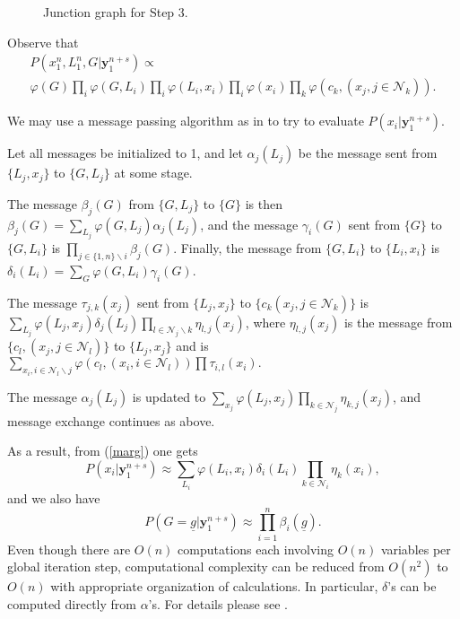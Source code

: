 \begin{figure}
\caption{Junction graph for Step 3.}
\end{figure}

Observe that
\begin{equation}\begin{array}{lll}
P(x_1^n,L_1^n,G|\mathbf{y}_1^{n+s}) \propto \\\varphi(G) \prod_{i}
\varphi(G,L_i) \prod_{i} \varphi(L_i,x_i) \prod_i\varphi(x_i)
\prod_k \varphi(c_k,(x_j, j \in \mathcal{N}_k)).\end{array}
\end{equation}

We may use a message passing algorithm as in \cite{aji} to try to
evaluate  $P(x_i|\mathbf{y}_1^{n+s})$.

Let all messages be initialized to 1, and let $\alpha_j(L_j)$ be
the message sent from $\{L_j,x_j\}$ to $\{G,L_j\}$ at some stage.

The message $\beta_j(G)$ from $\{G,L_j\}$ to $\{G\}$ is then
$\beta_j(G)=\sum_{L_j}\varphi (G,L_j)\alpha_j(L_j)$, and the
message $\gamma_i(G)$ sent from $\{G\}$ to $\{G,L_i\}$ is
$\prod_{j \in \{1,n\}\backslash i} \beta_j(G)$. Finally, the
message from $\{G,L_i\}$ to $\{L_i,x_i\}$ is
$\delta_i(L_i)=\sum_G\varphi(G,L_i)\gamma_i(G)$.

The message $\tau_{j,k}(x_j)$ sent from $\{L_j,x_j\}$ to $\{c_k
(x_j, j \in \mathcal{N}_k)\}$ is $\sum_{L_j}\varphi(L_j,x_j)
\delta_j(L_j)\prod_{l \in \mathcal{N}_j \backslash k}
\eta_{l,j}(x_j)$, where $\eta_{l,j}(x_j)$ is the message from
$\{c_l,(x_j, j\in \mathcal{N}_l)\}$ to $\{L_j,x_j\}$ and is
$\sum_{x_i,i\in \mathcal{N}_l\backslash j}\varphi(c_l, (x_i, i \in
\mathcal{N}_l)) \prod \tau_{i,l}(x_i).$

The message $\alpha_j(L_j)$ is updated to $\sum_{x_j}
\varphi(L_j,x_j) \prod_{k \in \mathcal{N}_j}\eta_{k,j}(x_j)$, and
message exchange continues as above.

As a result, from (\ref{marg}) one gets \begin{equation}P(x_i|
\mathbf{y}_1^{n+s}) \approx
\sum_{L_i}\varphi(L_i,x_i)\delta_i(L_i)\prod_{k \in \mathcal{N}_i}
\eta_k (x_i),\end{equation} and we also have
\begin{equation}
P(G=\underline{g}|\mathbf{y}_1^{n+s}) \approx \prod_{i=1}^n
\beta_i(\underline{g}).
\end{equation}
Even though there are $O(n)$ computations each involving $O(n)$
variables per global iteration step, computational complexity can
be reduced from $O(n^2)$ to $O(n)$ with appropriate organization
of calculations. In particular, $\delta$'s can be computed
directly from $\alpha$'s. For details please see \cite{tech:07}.


